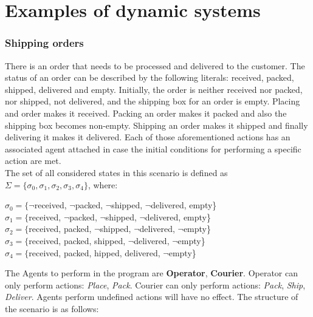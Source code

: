 \documentclass[a4paper]{article}
\begin{document}
\section{Examples of dynamic systems}
\subsubsection{Shipping orders}
There is an order that needs to be processed and delivered to the customer. The status of an order can be described by the following literals: received, packed, shipped, delivered and empty. 
Initially, the order is neither received nor packed, nor shipped, not delivered, and the shipping box for an order is empty.  
Placing and order makes it received. 
Packing an order makes it packed and also the shipping box becomes non-empty. 
Shipping an order makes it shipped and finally delivering it makes it delivered. 
Each of those aforementioned actions has an associated agent attached in case the initial conditions for performing a specific action are met. \\
The set of all considered states in this scenario is defined as $\Sigma = \{{\sigma_0, \sigma_1, \sigma_2, \sigma_3, \sigma_4\}}$, where:
\begin{center}
$\sigma_0 = \{${$\neg$received, $\neg$packed, $\neg$shipped, $\neg$delivered, empty}\} \\[0.1\baselineskip]
$\sigma_1 = \{${received, $\neg$packed, $\neg$shipped, $\neg$delivered, empty}\} \\[0.1\baselineskip]
$\sigma_2 = \{${received, packed, $\neg$shipped, $\neg$delivered, $\neg$empty}\} \\[0.1\baselineskip]
$\sigma_3 = \{${received, packed, shipped, $\neg$delivered, $\neg$empty}\} \\[0.1\baselineskip]
$\sigma_4 = \{${received, packed, hipped, delivered, $\neg$empty}\}
\end{center}
The Agents to perform in the program are \textbf{Operator}, \textbf{Courier}.
Operator can only perform actions: \textit{Place}, \textit{Pack}.
Courier can only perform actions: \textit{Pack}, \textit{Ship}, \textit{Deliver}.
Agents perform undefined actions will have no effect.
The structure of the scenario is as follows:
\end{document}
